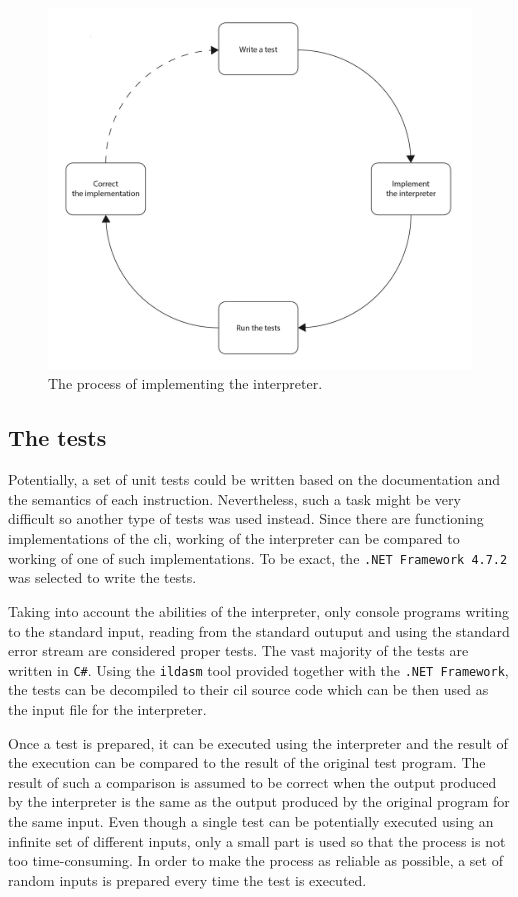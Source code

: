 \documentclass{article}
\numberwithin{equation}{section}
\begin{document}
\begin{figure}
	\includegraphics[width=1\textwidth]{process.jpg}
    \centering
    \caption{The process of implementing the interpreter.}
    \label{fig:process}
\end{figure}

\subsection{The tests}

Potentially, a set of unit tests could be written based on the documentation and the semantics of each instruction. Nevertheless, such a task might be very difficult so another type of tests was used instead. Since there are functioning implementations of the \acrshort{cli}, working of the interpreter can be compared to working of one of such implementations. To be exact, the \texttt{.NET Framework 4.7.2} was selected to write the tests.

Taking into account the abilities of the interpreter, only console programs writing to the standard input, reading from the standard outuput and using the standard error stream are considered proper tests. The vast majority of the tests are written in \texttt{C\#}. Using the \texttt{ildasm} tool provided together with the \texttt{.NET Framework}, the tests can be decompiled to their \acrshort{cil} source code which can be then used as the input file for the interpreter. 

Once a test is prepared, it can be executed using the interpreter and the result of the execution can be compared to the result of the original test program. The result of such a comparison is assumed to be correct when the output produced by the interpreter is the same as the output produced by the original program for the same input. Even though a single test can be potentially executed using an infinite set of different inputs, only a small part is used so that the process is not too time-consuming. In order to make the process as reliable as possible, a set of random inputs is prepared every time the test is executed.
\end{document}
